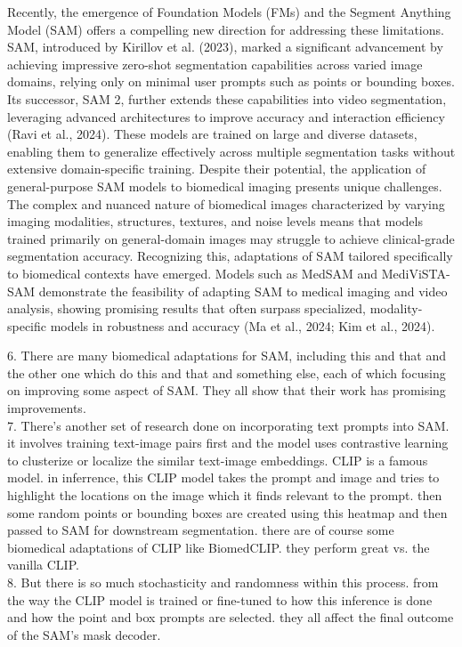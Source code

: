 \documentclass[./dissertation.tex]{subfiles}
\begin{document}
Recently, the emergence of Foundation Models (FMs) and the Segment Anything Model (SAM) offers a compelling new direction for addressing these limitations. SAM, introduced by Kirillov et al. (2023), marked a significant advancement by achieving impressive zero-shot segmentation capabilities across varied image domains, relying only on minimal user prompts such as points or bounding boxes. Its successor, SAM 2, further extends these capabilities into video segmentation, leveraging advanced architectures to improve accuracy and interaction efficiency (Ravi et al., 2024). These models are trained on large and diverse datasets, enabling them to generalize effectively across multiple segmentation tasks without extensive domain-specific training. Despite their potential, the application of general-purpose SAM models to biomedical imaging presents unique challenges. The complex and nuanced nature of biomedical images characterized by varying imaging modalities, structures, textures, and noise levels means that models trained primarily on general-domain images may struggle to achieve clinical-grade segmentation accuracy. Recognizing this, adaptations of SAM tailored specifically to biomedical contexts have emerged. Models such as MedSAM and MediViSTA-SAM demonstrate the feasibility of adapting SAM to medical imaging and video analysis, showing promising results that often surpass specialized, modality-specific models in robustness and accuracy (Ma et al., 2024; Kim et al., 2024).


6. There are many biomedical adaptations for SAM, including this and that and the other one which do this and that and something else, each of which focusing on improving some aspect of SAM. They all show that their work has promising improvements. \\

7. There's another set of research done on incorporating text prompts into SAM. it involves training text-image pairs first and the model uses contrastive learning to clusterize or localize the similar text-image embeddings. CLIP is a famous model. in inferrence, this CLIP model takes the prompt and image and tries to highlight the locations on the image which it finds relevant to the prompt. then some random points or bounding boxes are created using this heatmap and then passed to SAM for downstream segmentation. there are of course some biomedical adaptations of CLIP like BiomedCLIP. they perform great vs. the vanilla CLIP. \\

8. But there is so much stochasticity and randomness within this process. from the way the CLIP model is trained or fine-tuned to how this inference is done and how the point and box prompts are selected. they all affect the final outcome of the SAM's mask decoder. \\
\end{document}
